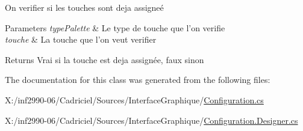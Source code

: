 On verifier si les touches sont deja assigneé 


\begin{DoxyParams}{Parameters}
{\em type\-Palette} & Le type de touche que l'on verifie\\
\hline
{\em touche} & La touche que l'on veut verifier\\
\hline
\end{DoxyParams}
\begin{DoxyReturn}{Returns}
Vrai si la touche est deja assignée, faux sinon
\end{DoxyReturn}


The documentation for this class was generated from the following files\-:\begin{DoxyCompactItemize}
\item 
X\-:/inf2990-\/06/\-Cadriciel/\-Sources/\-Interface\-Graphique/\hyperlink{_configuration_8cs}{Configuration.\-cs}\item 
X\-:/inf2990-\/06/\-Cadriciel/\-Sources/\-Interface\-Graphique/\hyperlink{_configuration_8_designer_8cs}{Configuration.\-Designer.\-cs}\end{DoxyCompactItemize}
